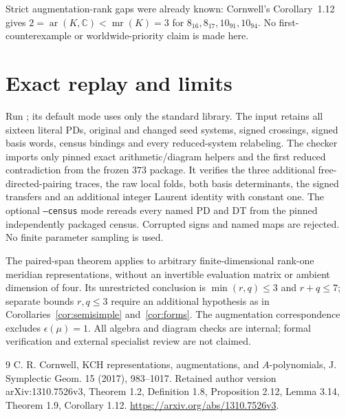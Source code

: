 \documentclass[11pt]{article}
\newcommand{\mr}{\operatorname{mr}}
\begin{document}
Strict augmentation-rank gaps were already known: Cornwell's
Corollary~1.12 gives $2=\operatorname{ar}(K,\mathbb C)<\mr(K)=3$
for $8_{16},8_{17},10_{91},10_{94}$. No first-counterexample or
worldwide-priority claim is made here.

\section{Exact replay and limits}

Run ; its default mode uses
only the standard library. The input
 retains all sixteen literal
PDs, original and changed seed systems, signed crossings, signed basis
words, census bindings and every reduced-system relabeling.
The checker imports only pinned exact arithmetic/diagram helpers and
the first reduced contradiction from the frozen $373$ package.
It verifies the three additional free-directed-pairing traces, the
raw local folds, both basis determinants, the signed transfers and an
additional integer Laurent identity with constant one.
The optional \texttt{--census} mode rereads every named PD and DT from
the pinned independently packaged census. Corrupted signs and named
maps are rejected. No finite parameter sampling is used.

The paired-span theorem applies to arbitrary finite-dimensional
rank-one meridian representations, without an invertible evaluation
matrix or ambient dimension of four. Its unrestricted conclusion is
$\min(r,q)\le3$ and $r+q\le7$; separate bounds $r,q\le3$
require an additional hypothesis as in
Corollaries~\ref{cor:semisimple} and~\ref{cor:forms}.
The augmentation correspondence excludes $\epsilon(\mu)=1$.
All algebra and diagram checks are internal; formal verification and
external specialist review are not claimed.

\begin{thebibliography}{9}
 C. R. Cornwell, KCH representations, augmentations,
and $A$-polynomials, J. Symplectic Geom. 15 (2017), 983--1017.
Retained author version arXiv:1310.7526v3, Theorem 1.2,
Definition 1.8, Proposition 2.12, Lemma 3.14, Theorem 1.9, Corollary 1.12.
\url{https://arxiv.org/abs/1310.7526v3}.
\end{thebibliography}
\end{document}
